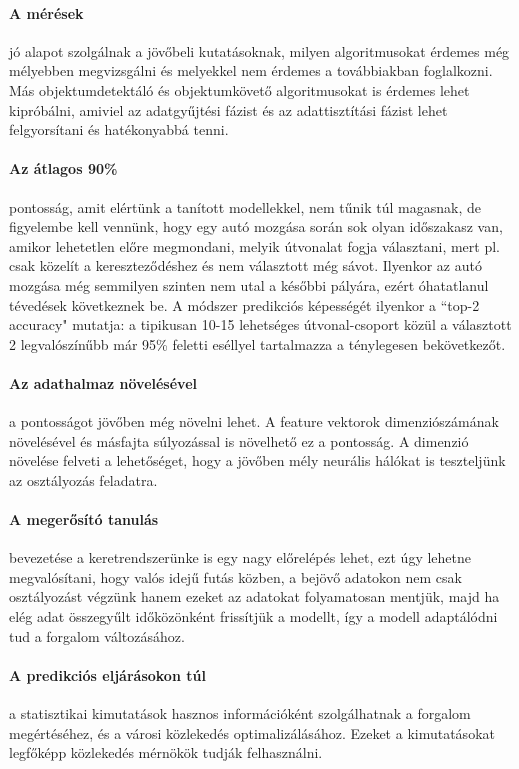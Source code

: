 \documentclass[12pt,a4paper]{article}
\begin{document}
\paragraph{A mérések} jó alapot szolgálnak a jövőbeli kutatásoknak, milyen algoritmusokat érdemes még mélyebben megvizsgálni és melyekkel nem érdemes a továbbiakban foglalkozni. Más objektumdetektáló és objektumkövető algoritmusokat is érdemes lehet kipróbálni, amiviel az adatgyűjtési fázist és az adattisztítási fázist lehet felgyorsítani és hatékonyabbá tenni.
\paragraph{Az átlagos 90\%} pontosság, amit elértünk a tanított modellekkel, nem tűnik túl magasnak, de figyelembe kell vennünk, hogy egy autó mozgása során sok olyan időszakasz van, amikor lehetetlen előre megmondani, melyik útvonalat fogja választani, mert pl. csak közelít a kereszteződéshez és nem választott még sávot. Ilyenkor az autó mozgása még semmilyen szinten nem utal a későbbi pályára, ezért óhatatlanul tévedések következnek be. A módszer predikciós képességét ilyenkor a ``top-2 accuracy" mutatja: a tipikusan 10-15 lehetséges útvonal-csoport közül a választott 2 legvalószínűbb már 95\% feletti eséllyel tartalmazza a ténylegesen bekövetkezőt.
\paragraph{Az adathalmaz növelésével} a pontosságot jövőben még növelni lehet. A feature vektorok dimenziószámának növelésével és másfajta súlyozással is növelhető ez a pontosság. A dimenzió növelése felveti a lehetőséget, hogy a jövőben mély neurális hálókat is teszteljünk az osztályozás feladatra.
\paragraph{A megerősító tanulás} bevezetése a keretrendszerünke is egy nagy előrelépés lehet, ezt úgy lehetne megvalósítani, hogy valós idejű futás közben, a bejövő adatokon nem csak osztályozást végzünk hanem ezeket az adatokat folyamatosan mentjük, majd ha elég adat összegyűlt időközönként frissítjük a modellt, így a modell adaptálódni tud a forgalom változásához.
\paragraph{A predikciós eljárásokon túl} a statisztikai kimutatások hasznos információként szolgálhatnak a forgalom megértéséhez, és a városi közlekedés optimalizálásához. Ezeket a kimutatásokat legfőképp közlekedés mérnökök tudják felhasználni.

\newpage
\printbibliography
\end{document}
